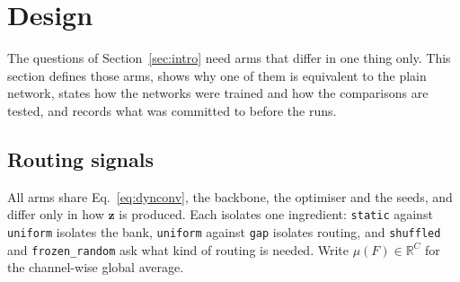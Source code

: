 \documentclass[10pt,a4paper]{article}
\newcommand{\zv}{\mathbf{z}}
\begin{document}
\section{Design}\label{sec:method}

The questions of Section~\ref{sec:intro} need arms that differ in one thing
only. This section defines those arms, shows why one of them is equivalent to
the plain network, states how the networks were trained and how the
comparisons are tested, and records what was committed to before the runs.

\subsection{Routing signals}

All arms share Eq.~\eqref{eq:dynconv}, the backbone, the optimiser and the
seeds, and differ only in how $\zv$ is produced. Each isolates one
ingredient: \texttt{static} against \texttt{uniform} isolates the bank,
\texttt{uniform} against \texttt{gap} isolates routing, and \texttt{shuffled}
and \texttt{frozen\_random} ask what kind of routing is needed. Write
$\mu(F)\in\mathbb{R}^{C}$ for the channel-wise global average.
\end{document}

